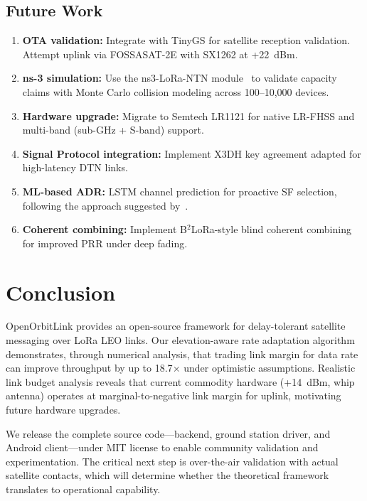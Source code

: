 \documentclass[11pt,a4paper]{article}
\begin{document}
\subsection{Future Work}

\begin{enumerate}
    \item \textbf{OTA validation:} Integrate with TinyGS for satellite reception validation. Attempt uplink via FOSSASAT-2E with SX1262 at +22~dBm.
    
    \item \textbf{ns-3 simulation:} Use the ns3-LoRa-NTN module~\cite{traspadini2025ns3ntn} to validate capacity claims with Monte Carlo collision modeling across 100--10,000 devices.
    
    \item \textbf{Hardware upgrade:} Migrate to Semtech LR1121 for native LR-FHSS and multi-band (sub-GHz + S-band) support.
    
    \item \textbf{Signal Protocol integration:} Implement X3DH key agreement adapted for high-latency DTN links.
    
    \item \textbf{ML-based ADR:} LSTM channel prediction for proactive SF selection, following the approach suggested by~\cite{yu2026framework}.
    
    \item \textbf{Coherent combining:} Implement B$^2$LoRa-style blind coherent combining~\cite{b2lora2025} for improved PRR under deep fading.
\end{enumerate}

\section{Conclusion}
\label{sec:conclusion}

OpenOrbitLink provides an open-source framework for delay-tolerant satellite messaging over LoRa LEO links. Our elevation-aware rate adaptation algorithm demonstrates, through numerical analysis, that trading link margin for data rate can improve throughput by up to 18.7$\times$ under optimistic assumptions. Realistic link budget analysis reveals that current commodity hardware (+14~dBm, whip antenna) operates at marginal-to-negative link margin for uplink, motivating future hardware upgrades.

We release the complete source code---backend, ground station driver, and Android client---under MIT license to enable community validation and experimentation. The critical next step is over-the-air validation with actual satellite contacts, which will determine whether the theoretical framework translates to operational capability.
\end{document}
